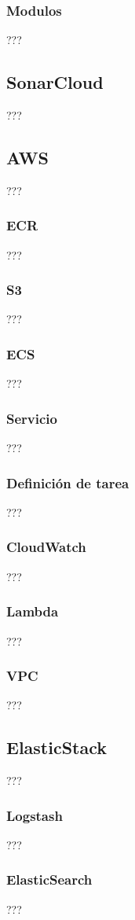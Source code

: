 \subsubsection {Modulos}
???
\subsection {SonarCloud}
???
\subsection {AWS}
???
\subsubsection {ECR}
???
\subsubsection {S3}
???
\subsubsection {ECS}
???
\subsubsection {Servicio}
???
\subsubsection {Definición de tarea}
???
\subsubsection {CloudWatch}
???
\subsubsection {Lambda}
???
\subsubsection {VPC}
???
\subsection {ElasticStack}
???
\subsubsection {Logstash}
???
\subsubsection {ElasticSearch}
???
